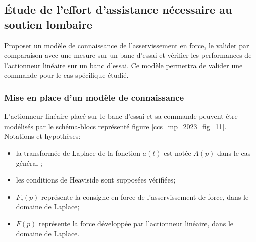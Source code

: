 %
%
%

\subsection{Étude de l'effort d'assistance nécessaire au soutien lombaire}%
\begin{obj}
Proposer un modèle de connaissance de l'asservissement en force, le valider par comparaison avec une mesure sur un banc d'essai et vérifier les performances de l'actionneur linéaire sur un banc d'essai. Ce modèle permettra de valider une commande pour le cas spécifique étudié.
\end{obj}


\subsubsection{Mise en place d'un modèle de connaissance}%
\ifprof
\else

L'actionneur linéaire placé sur le banc d'essai et sa commande peuvent être modélisés par le schéma-blocs représenté figure \ref{ccs_mp_2023_fig_11}.\\
Notations et hypothèses:

\begin{itemize}
  \item la transformée de Laplace de la fonction $a(t)$ est notée $A(p)$ dans le cas général ;
  \item les conditions de Heaviside sont supposées vérifiées;
  \item $F_{c}(p)$ représente la consigne en force de l'asservissement de force, dans le domaine de Laplace;
  \item $F(p)$ représente la force développée par l'actionneur linéaire, dans le domaine de Laplace.
\end{itemize}

